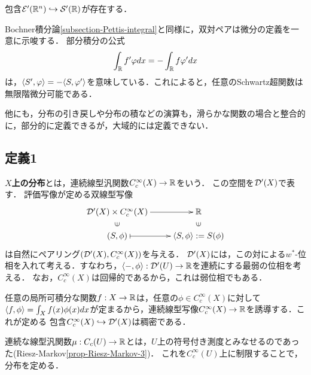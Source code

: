 \documentclass[uplatex,dvipdfmx]{jsreport}
\begin{document}
\begin{theorem}
    包含$\mathcal{E}'(\mathbb{R}^n)\hookrightarrow\mathcal{S}'(\mathbb{R})$が存在する．
\end{theorem}

\begin{discussion}[双対ペアと微分]
    Bochner積分論\ref{subsection-Pettis-integral}と同様に，双対ペアは微分の定義を一意に示唆する．
    部分積分の公式
    \[\int_{\mathbb{R}} f'\varphi dx=-\int_{\mathbb{R}} f\varphi'dx\]
    は，$\langle S',\varphi\rangle=-\langle S,\varphi'\rangle$を意味している．これによると，任意のSchwartz超関数は無限階微分可能である．
\end{discussion}

\begin{discussion}[その他の操作と演算]
    他にも，分布の引き戻しや分布の積などの演算も，滑らかな関数の場合と整合的に，部分的に定義できるが，大域的には定義できない．
\end{discussion}

\subsection{定義1}

\begin{definition}[distribution on $X$]
    \textbf{$X$上の分布}とは，連続線型汎関数$C_c^\infty(X)\to\mathbb{R}$をいう．
    この空間を$\mathcal{D}'(X)$で表す．
    評価写像が定める双線型写像
    \[\xymatrix@R-2pc{
        \D'(X)\times C^\infty_c(X)\ar[r]&\R\\
        \rotatebox[origin=c]{90}{$\in$}&\rotatebox[origin=c]{90}{$\in$}\\
        (S,\phi)\ar@{|->}[r]&\brac{S,\phi}:=S(\phi)
    }\]
    は自然にペアリング$(\mathcal{D}'(X),C_c^\infty(X))$を与える．
    $\mathcal{D}'(X)$には，この対による$w^*$-位相を入れて考える．すなわち，$\langle-,\phi\rangle:\mathcal{D}'(U)\to\mathbb{R}$を連続にする最弱の位相を考える．
    なお，$C^\infty_c(X)$は回帰的であるから，これは弱位相でもある．
\end{definition}

\begin{example}
    任意の局所可積分な関数$f:X\to\mathbb{R}$は，任意の$\phi\in C_c^\infty(X)$に対して
    $\langle f,\phi\rangle=\int_Xf(x)\phi(x)dx$が定まるから，連続線型写像$C_c^\infty(X)\to\mathbb{R}$を誘導する．これが定める
    包含$C_c^\infty(X)\hookrightarrow\mathcal{D}'(X)$は稠密である．
\end{example}

\begin{example}
    連続な線型汎関数$\mu:C_c(U)\to\mathbb{R}$とは，$U$上の符号付き測度とみなせるのであった(Riesz-Markov\ref{prop-Riesz-Markov-3})．
    これを$C_c^\infty(U)$上に制限することで，分布を定める．
\end{example}
\end{document}
